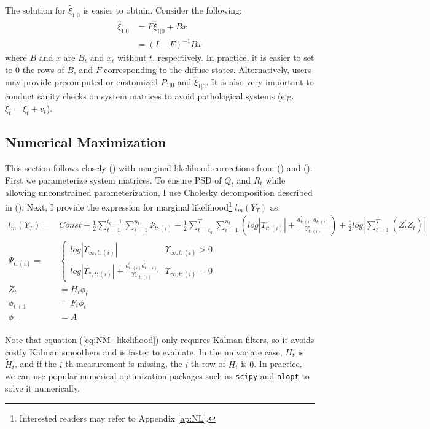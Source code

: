 \documentclass[10pt, titlepage]{article}
\numberwithin{equation}{section}
\begin{document}
The solution for $\hat{\xi}_{1|0}$ is easier to obtain. Consider the following:
\begin{align*}
    \hat{\xi}_{1|0} &= F\hat{\xi}_{1|0} + Bx \\
    &= (I - F)^{-1}Bx
\end{align*}
where $B$ and $x$ are $B_t$ and $x_t$ without $t$, respectively. In practice, it is easier to set to $0$ the rows of $B$, and $F$ corresponding to the diffuse states. Alternatively, users may provide precomputed or customized $P_{1|0}$ and $\hat{\xi}_{1|0}$. It is also very important to conduct sanity checks on system matrices to avoid pathological systems (e.g. $\xi_{t} = \xi_t + v_t$).

\subsection{Numerical Maximization} \label{subsec:NM}
This section follows closely (\cite{durbin_koopman_2001}) with marginal likelihood corrections from (\cite{francke2010likelihood}) and (\cite{harville1974bayesian}). First we parameterize system matrices. To ensure PSD of $Q_t$ and $R_t$ while allowing unconstrained parameterization, I use Cholesky decomposition described in (\cite{pinheiro1996unconstrained}). Next, I provide the expression for marginal likelihood\footnote{Interested readers may refer to Appendix \ref{ap:NL}.} $l_m(Y_T)$ as:
\begin{align}
    l_m(Y_T) =& Const - \frac{1}{2}\sum_{t=1}^{t_q-1}\sum_{i=1}^{n_t}\Psi_{t:(i)} - \frac{1}{2}\sum_{t=t_q}^{T}\sum_{i=1}^{n_t}\left(log|\Upsilon_{t:(i)}| + \frac{d_{t:(i)}^{'}d_{t:(i)}}{\Upsilon_{t:(i)}}\right) + \frac{1}{2}log\left| \sum_{t=1}^{T}(Z_t^{'}Z_t) \right| \label{eq:NM_likelihood} \\
    \Psi_{t:(i)} =& \begin{cases}
        log|\Upsilon_{\infty,t:(i)}| & \Upsilon_{\infty,t:(i)} > 0 \\
        log|\Upsilon_{*,t:(i)}| + \frac{d_{t:(i)}^{'}d_{t:(i)}}{\Upsilon_{*,t:(i)}} & \Upsilon_{\infty,t:(i)}=0
    \end{cases} \nonumber \\
    Z_t &= H_t\phi_t \label{eq:marginal_correct} \\
    \phi_{t+1} &= F_t\phi_t \nonumber \\
    \phi_1 &= A \nonumber
\end{align}

Note that equation (\ref{eq:NM_likelihood}) only requires Kalman filters, so it avoids costly Kalman smoothers and is faster to evaluate. In the univariate case, $H_t$ is $\tilde{H}_t$, and if the $i$-th measurement is missing, the $i$-th row of $H_t$ is $0$.  In practice, we can use popular numerical optimization packages such as \texttt{scipy} and \texttt{nlopt} to solve it numerically.
\end{document}
